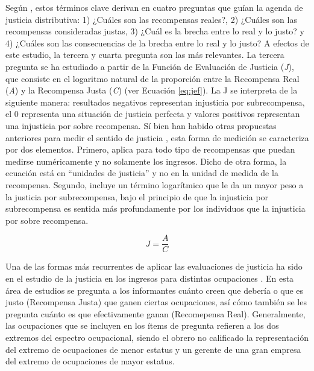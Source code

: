 \documentclass[12pt,twoside]{templates/facsothesis}
\begin{document}
Según \citet{Jasso2015}, estos términos clave derivan en cuatro preguntas que guían la agenda de justicia distributiva: 1) ¿Cuáles son las recompensas reales?, 2) ¿Cuáles son las recompensas consideradas justas, 3) ¿Cuál es la brecha entre lo real y lo justo? y 4) ¿Cuáles son las consecuencias de la brecha entre lo real y lo justo? A efectos de este estudio, la tercera y cuarta pregunta son las más relevantes. La tercera pregunta se ha estudiado a partir de la Función de Evaluación de Justicia (\emph{J}), que consiste en el logaritmo natural de la proporción entre la Recompensa Real (\emph{A}) y la Recompensa Justa (\emph{C}) (ver Ecuación \eqref{eq:jef}). La J se interpreta de la siguiente manera: resultados negativos representan injusticia por subrecompensa, el 0 representa una situación de justicia perfecta y valores positivos representan una injusticia por sobre recompensa. Sí bien han habido otras propuestas anteriores para medir el sentido de justicia \citep[ver discusión en][]{Jasso1978}, esta forma de medición se caracteriza por dos elementos. Primero, aplica para todo tipo de recompensas que puedan medirse numéricamente y no solamente los ingresos. Dicho de otra forma, la ecuación está en ``unidades de justicia'' y no en la unidad de medida de la recompensa. Segundo, incluye un término logarítmico que le da un mayor peso a la justicia por subrecompensa, bajo el principio de que la injusticia por subrecompensa es sentida más profundamente por los individuos que la injusticia por sobre recompensa.

\begin{equation}
  J=\frac{A}{C} 
  \label{eq:jef}
\end{equation}

Una de las formas más recurrentes de aplicar las evaluaciones de justicia ha sido en el estudio de la justicia en los ingresos para distintas ocupaciones \citep{Headey1991, Kelley1993}. En esta área de estudios se pregunta a los informantes cuánto creen que debería o que es justo (Recompensa Justa) que ganen ciertas ocupaciones, así cómo también se les pregunta cuánto es que efectivamente ganan (Recomepensa Real). Generalmente, las ocupaciones que se incluyen en los ítems de pregunta refieren a los dos extremos del espectro ocupacional, siendo el obrero no calificado la representación del extremo de ocupaciones de menor estatus y un gerente de una gran empresa del extremo de ocupaciones de mayor estatus.
\end{document}
